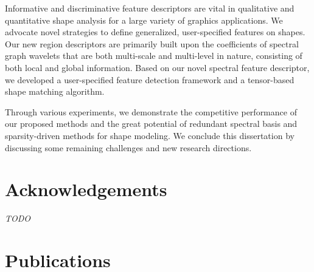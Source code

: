 \documentclass[12pt,letterpaper,twosided]{report}
\numberwithin{equation}{section}
\begin{document}
Informative and discriminative feature descriptors are vital in qualitative and
quantitative shape analysis for a large variety of graphics applications. We
advocate novel strategies to define generalized, user-specified features on
shapes. Our new region descriptors are primarily built upon the coefficients of
spectral graph wavelets that are both multi-scale and multi-level in nature,
consisting of both local and global information. Based on our novel spectral
feature descriptor, we developed a user-specified feature
detection framework and a tensor-based shape matching algorithm.

Through various experiments, we demonstrate the competitive performance of our
proposed methods and the great potential of redundant spectral basis and
sparsity-driven methods for shape modeling. We conclude this dissertation by
discussing some remaining challenges and new research directions.


\onehalfspacing

\tableofcontents

\clearpage
{}
{}
\listoffigures

\clearpage
{}
{}
\listoftables

\chapter*{Acknowledgements}
\emph{TODO}

\newpage
\chapter*{Publications}
\end{document}
